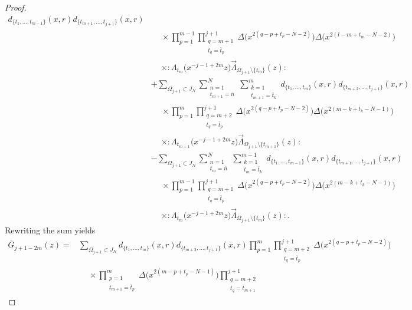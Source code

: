 \documentclass[10pt,a4paper]{amsart}
\numberwithin{equation}{section}
\begin{document}
\begin{proof}
\begin{align*}
d_{\{t_1,\dots, t_{m-1}\}}(x,r) d_{\{t_{m+1},\dots, t_{j+1}\}}(x,r)
\\
&\phantom{-}\times \prod_{p=1}^{m-1}\prod\limits_{\substack{q=m+1\\t_q=\overline{t}_p}}^{j+1}
\Delta\big(x^{2(q-p+t_p-N-2)}\big)\Delta\big(x^{2(l-m+t_m-N-2)}\big)
\\
&\phantom{-}\times {:}\Lambda_{t_{m}}\big(x^{-j-1+2m}z\big)
\overrightarrow{\Lambda}_{\Omega_{j+1}\setminus \{t_m\}}(z){:}
\\
&+\sum_{\Omega_{j+1} \subset J_N}
\sum\limits_{\substack{n=1\\t_{m+1}=\overline{n}}}^N
\sum\limits_{\substack{k=1\\t_{m+1}=\overline{t}_k}}^m
d_{\{t_1,\dots, t_m\}}(x,r) d_{\{t_{m+2}, \dots, t_{j+1}\}}(x,r)
\\
&\phantom{-}\times
\prod_{p=1}^m\prod\limits_{\substack{q=m+2\\t_q=\overline{t}_p}}^{j+1}
\Delta\big(x^{2(q-p+t_p-N-2)}\big)\Delta\big(x^{2(m-k+t_k-N-1)}\big)
\\
&\phantom{-}\times{:}\Lambda_{t_{m+1}}\big(x^{-j-1+2m}z\big)
\overrightarrow{\Lambda}_{\Omega_{j+1}\setminus \{t_{m+1}\}}(z){:}
\\
&-\sum_{\Omega_{j+1}\subset J_N}
\sum\limits_{\substack{n=1\\t_m=\overline{n}}}^N
\sum\limits_{\substack{k=1\\t_m=\overline{t}_k}}^{m-1}
d_{\{t_1, \dots, t_{m-1}\}}(x,r) d_{\{t_{m+1}, \dots, t_{j+1}\}}(x,r)
\\
&\phantom{-}\times\prod_{p=1}^{m-1}\prod\limits_{\substack{q=m+1\\t_q=\overline{t}_p}}^{j+1}
\Delta\big(x^{2(q-p+t_p-N-2)}\big)
\Delta\big(x^{2(m-k+t_k-N-1)}\big)
\\
&\phantom{-}\times{:}\Lambda_{t_{m}}\big(x^{-j-1+2m}z\big)
\overrightarrow{\Lambda}_{\Omega_{j+1}\setminus \{t_m\}}(z){:}.
\end{align*}
Rewriting the sum yields
\begin{align*}
\overline{G}_{j+1-2m}(z)={}&
\sum_{\Omega_{j+1}\subset J_N}
d_{\{t_1,\dots,t_m\}}(x,r) d_{\{t_{m+2},\dots,t_{j+1}\}}(x,r)
\prod_{p=1}^m \prod\limits_{\substack{q=m+2
\\t_q=\overline{t}_p}}^{j+1}\Delta\big(x^{2(q-p+t_p-N-2)}\big)
\\
&\phantom{-}\times\prod\limits_{\substack{p=1\\t_{m+1}=\overline{t}_p}}^m
\Delta\big(x^{2(m-p+t_p-N-1)}\big)
\prod\limits_{\substack{q=m+2\\t_q=\overline{t}_{m+1}}}^{j+1}

\end{align*}
\end{proof}
\end{document}
